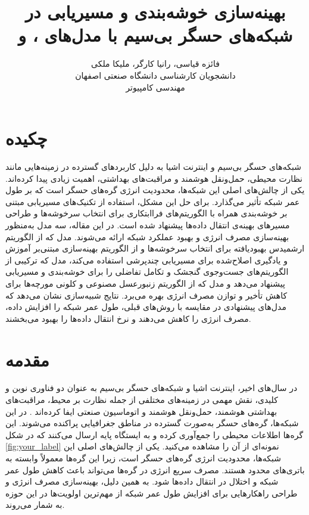 \documentclass[12pt, onecolumn, a4paper]{article}
\begin{document}
	
	\title{بهینه‌سازی خوشه‌بندی و مسیریابی در شبکه‌های حسگر بی‌سیم با مدل‌های ،  و } 
	\author{فائزه قیاسی، رانیا کارگر، ملیکا ملکی\\
		دانشجویان کارشناسی دانشگاه صنعتی اصفهان\\
		مهندسی کامپیوتر}
	\date{}
	\maketitle
	\thispagestyle{empty}
	\vfill
	
	\section*{چکیده}
	شبکه‌های حسگر بی‌سیم و اینترنت اشیا به دلیل کاربردهای گسترده در زمینه‌هایی مانند نظارت محیطی، حمل‌ونقل هوشمند و مراقبت‌های بهداشتی، اهمیت زیادی پیدا کرده‌اند. یکی از چالش‌های اصلی این شبکه‌ها، محدودیت انرژی گره‌های حسگر است که بر طول عمر شبکه تأثیر می‌گذارد. برای حل این مشکل، استفاده از تکنیک‌های مسیریابی مبتنی بر خوشه‌بندی همراه با الگوریتم‌های فراابتکاری برای انتخاب سرخوشه‌ها و طراحی مسیرهای بهینه‌ی انتقال داده‌ها پیشنهاد شده است. در این مقاله، سه مدل به‌منظور بهینه‌سازی مصرف انرژی و بهبود عملکرد شبکه ارائه می‌شوند. مدل  که از الگوریتم ارشمیدس بهبودیافته برای انتخاب سرخوشه‌ها و از الگوریتم بهینه‌سازی مبتنی‌بر آموزش و یادگیری اصلاح‌شده برای مسیریابی چندپرشی استفاده می‌کند، مدل  که ترکیبی از الگوریتم‌های جست‌وجوی گنجشک و تکامل تفاضلی را برای خوشه‌بندی و مسیریابی پیشنهاد می‌دهد و مدل  که از الگوریتم زنبورعسل مصنوعی و کلونی مورچه‌ها برای کاهش تأخیر و توازن مصرف انرژی بهره می‌برد. نتایج شبیه‌سازی نشان می‌دهد که مدل‌های پیشنهادی در مقایسه با روش‌های قبلی، طول عمر شبکه را افزایش داده، مصرف انرژی را کاهش می‌دهند و نرخ انتقال داده‌ها را بهبود می‌بخشند. 
	
	\newpage
	
	\section{مقدمه}
	در سال‌های اخیر، اینترنت اشیا و شبکه‌های حسگر بی‌سیم به عنوان دو فناوری نوین و کلیدی، نقش مهمی در زمینه‌های مختلفی از جمله نظارت بر محیط، مراقبت‌های بهداشتی هوشمند، حمل‌ونقل هوشمند و اتوماسیون صنعتی ایفا کرده‌اند \cite{ref1, ref2, ref3}. در این شبکه‌ها، گره‌های حسگر به‌صورت گسترده در مناطق جغرافیایی پراکنده می‌شوند. این گره‌ها اطلاعات محیطی را جمع‌آوری کرده و به ایستگاه پایه ارسال می‌کنند که در شکل \ref{fig:your_label} نمونه‌ای از آن را مشاهده می‌کنید. یکی از چالش‌های اصلی این شبکه‌ها، محدودیت انرژی گره‌های حسگر است، زیرا این گره‌ها معمولاً وابسته به باتری‌های محدود هستند. مصرف سریع انرژی در گره‌ها می‌تواند باعث کاهش طول عمر شبکه و اختلال در انتقال داده‌ها شود. به همین دلیل، بهینه‌سازی مصرف انرژی و طراحی راهکارهایی برای افزایش طول عمر شبکه از مهم‌ترین اولویت‌ها در این حوزه به شمار می‌روند.
	
\end{document}
